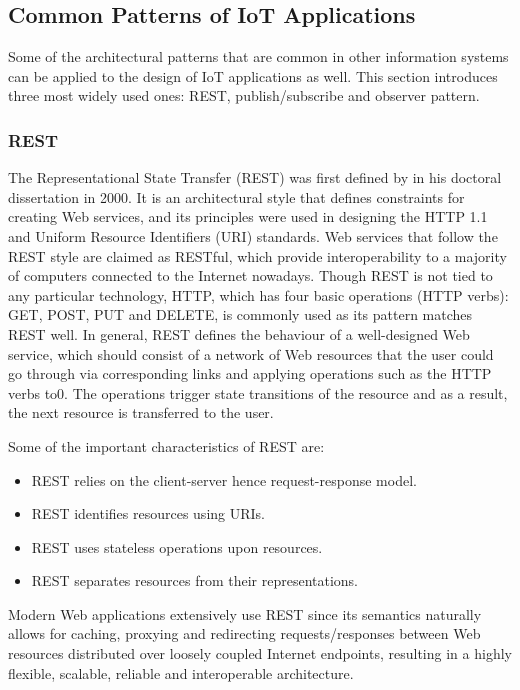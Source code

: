 \subsection{Common Patterns of IoT Applications}

Some of the architectural patterns that are common in other information systems can be applied to the design of IoT applications as well. This section introduces three most widely used ones: REST, publish/subscribe and observer pattern.

\subsubsection{REST}

The Representational State Transfer (REST) was first defined by \textcite{fielding2000architectural} in his doctoral dissertation in 2000. It is an architectural style that defines constraints for creating Web services, and its principles were used in designing the HTTP 1.1 \autocite{http1.1} and Uniform Resource Identifiers (URI) \autocite{uri_rfc} standards. Web services that follow the REST style are claimed as RESTful, which provide interoperability to a majority of computers connected to the Internet nowadays. Though REST is not tied to any particular technology, HTTP, which has four basic operations (HTTP verbs): GET, POST, PUT and DELETE, is commonly used as its pattern matches REST well. In general, REST defines the behaviour of a well-designed Web service, which should consist of a network of Web resources that the user could go through via corresponding links and applying operations such as the HTTP verbs to0. The operations trigger state transitions of the resource and as a result, the next resource is transferred to the user. 

Some of the important characteristics of REST are:

\begin{itemize}
\item REST relies on the client-server hence request-response model.
\item REST identifies resources using URIs.
\item REST uses stateless operations upon resources.
\item REST separates resources from their representations.
\end{itemize}

Modern Web applications extensively use REST since its semantics naturally allows for caching, proxying and redirecting requests/responses between Web resources distributed over loosely coupled Internet endpoints, resulting in a highly flexible, scalable, reliable and interoperable architecture.

